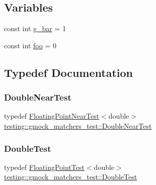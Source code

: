 \subsection*{Variables}
\begin{DoxyCompactItemize}
\item 
const int \hyperlink{namespacetesting_1_1gmock__matchers__test_a55dcc962203a3a3361d2e7e00ed99b4d}{g\+\_\+bar} = 1
\item 
const int \hyperlink{namespacetesting_1_1gmock__matchers__test_a3536e68112ffbb1f76887cd15bb45c15}{foo} = 0
\end{DoxyCompactItemize}


\subsection{Typedef Documentation}
\mbox{\label{namespacetesting_1_1gmock__matchers__test_aea537d0183ccc65b5c49a75d711993c8}} 
\subsubsection{\texorpdfstring{Double\+Near\+Test}{DoubleNearTest}}
{\footnotesize\ttfamily typedef \hyperlink{classtesting_1_1gmock__matchers__test_1_1_floating_point_near_test}{Floating\+Point\+Near\+Test}$<$double$>$ \hyperlink{namespacetesting_1_1gmock__matchers__test_aea537d0183ccc65b5c49a75d711993c8}{testing\+::gmock\+\_\+matchers\+\_\+test\+::\+Double\+Near\+Test}}

\mbox{\label{namespacetesting_1_1gmock__matchers__test_a944cdd366ed240f29ae8e3ebc753ad5c}} 
\subsubsection{\texorpdfstring{Double\+Test}{DoubleTest}}
{\footnotesize\ttfamily typedef \hyperlink{classtesting_1_1gmock__matchers__test_1_1_floating_point_test}{Floating\+Point\+Test}$<$double$>$ \hyperlink{namespacetesting_1_1gmock__matchers__test_a944cdd366ed240f29ae8e3ebc753ad5c}{testing\+::gmock\+\_\+matchers\+\_\+test\+::\+Double\+Test}}

